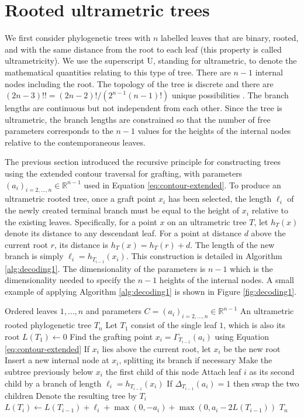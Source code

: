 \documentclass{article}
\begin{document}
\section{Rooted ultrametric trees}

We first consider phylogenetic trees with $n$ labelled leaves that are binary, rooted,
and with the same distance from the root to each leaf (this property is called ultrametricity).
We use the superscript U, standing for ultrametric, 
to denote the mathematical quantities relating to this
type of tree.
There are $n-1$ internal nodes including the root.
The topology of the tree is 
discrete and there are 
$(2n-3)!!=(2n-2)!/(2^{n-1}(n-1)!)$ unique possibilities \citep{Felsenstein1978b}. 
The branch lengths are continuous but not independent from each other.
Since the tree is ultrametric, the branch lengths are constrained
so that the number of free parameters corresponds to the $n-1$ values
for the heights of the internal nodes relative to the contemporaneous leaves.

The previous section introduced the recursive principle for constructing
trees using the extended contour traversal for grafting, with 
parameters $(a_i)_{i=2,...,n} \in \mathbb{R}^{n-1}$ used in Equation \ref{eq:contour-extended}.
To produce an ultrametric rooted tree, once a
graft point $x_i$ has been selected, the length $\ell_i$ of the newly created terminal branch must be equal to the height of $x_i$ relative to 
the existing leaves. 
Specifically, for a point $x$ on an ultrametric tree $T$, 
let $h_T(x)$ denote its distance to any descendant leaf.
For a point at distance $d$ above the current root $r$, its distance is $h_T(x)=h_T(r)+d$. The length of the new branch is simply
$\ell_i=h_{T_{i-1}}(x_i)$.
This construction is detailed in Algorithm \ref{alg:decoding1}.
The dimensionality of the parameters
is $n-1$ which is the dimensionality needed to specify the 
$n-1$ heights of the internal nodes. 
A small example of applying Algorithm \ref{alg:decoding1}
is shown in Figure \ref{fig:decoding1}.

\begin{algorithm}
\caption{Construction of ultrametric rooted trees}
\label{alg:decoding1}
\begin{algorithmic}[1]
\Require Ordered leaves $1,\ldots,n$ and parameters
         $C=(a_i)_{i=2,...,n}\in\mathbb{R}^{n-1}$
\Ensure An ultrametric rooted phylogenetic tree $T_n$
\State Let $T_1$ consist of the single leaf $1$, which is also its root
\State $L(T_1)\gets 0$
   \State Find the grafting point $x_i=\Gamma_{T_{i-1}}(a_i)$ using Equation \ref{eq:contour-extended}
    \State If $x_i$ lies above the current root, let $x_i$ be the new root
    \State Insert a new internal node at $x_i$, splitting its branch if necessary
    \State Make the subtree previously below $x_i$ the first child of this node
    \State Attach leaf $i$ as its second child by a branch of length $\ell_i=h_{T_{i-1}}(x_i)$
    \State If $\Delta_{T_{i-1}}(a_i)=1$ then swap the two children
    \State Denote the resulting tree by $T_i$
    \State $L(T_i)\gets L(T_{i-1})+\ell_i
          +\max(0,-a_i)+\max(0,a_i-2L(T_{i-1}))$
\EndFor
\State \Return $T_n$
\end{algorithmic}
\end{algorithm}
\end{document}
